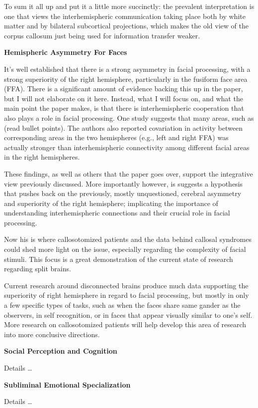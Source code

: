 \documentclass[basic]{inVerba-notes}
\begin{document}
To sum it all up and put it a little more succinctly: the prevalent interpretation is one that views the interhemispheric communication taking place both by white matter and by bilateral subcortical projections, which makes the old view of the corpus callosum just being used for information transfer weaker.

\textbf{Hemispheric Asymmetry For Faces}

It's well established that there is a strong asymmetry in facial processing, with a strong superiority of the right hemisphere, particularly in the fusiform face area (FFA). There is a significant amount of evidence backing this up in the paper, but I will not elaborate on it here. Instead, what I will focus on, and what the main point the paper makes, is that there is interhemispheric cooperation that also plays a role in facial processing. One study suggests that many areas, such as (read bullet points). The authors also reported covariation in activity between corresponding areas in the two hemispheres (e.g., left and right FFA) was actually stronger than interhemispheric connectivity among different facial areas in the right hemispheres.

These findings, as well as others that the paper goes over, support the integrative view previously discussed. More importantly however, is suggests a hypothesis that pushes back on the previously, mostly unquestioned, cerebral asymmetry and superiority of the right hemisphere; implicating the importance of understanding interhemispheric connections and their crucial role in facial processing.

Now his is where callosotomized patients and the data behind callosal syndromes could shed more light on the issue, especially regarding the complexity of facial stimuli. This focus is a great demonstration of the current state of research regarding split brains. 

Current research around disconnected brains produce much data supporting the superiority of right hemisphere in regard to facial processing, but mostly in only a few specific types of tasks, such as when the faces share same gander as the observers, in self recognition, or in faces that appear visually similar to one's self. More research on callosotomized patients will help develop this area of research into more conclusive directions.

\textbf{Social Perception and Cognition}

Details \dots 

\textbf{Subliminal Emotional Specialization}

Details \dots 
\end{document}

